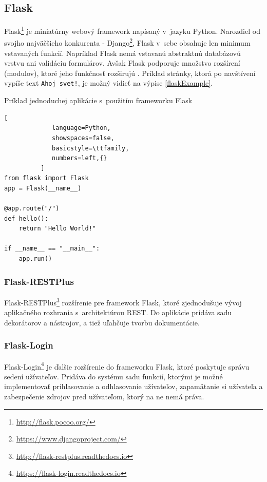\documentclass[zadani,slovak]{fitthesis}
\begin{document}
\subsection{Flask}\label{flask}
Flask\footnote{\url{http://flask.pocoo.org/}} je miniatúrny webový framework napísaný v~jazyku Python. Narozdiel od svojho najväčšieho konkurenta - Django\footnote{\url{https://www.djangoproject.com/}}, Flask v~sebe obsahuje len minimum vstavaných funkcií. Napríklad Flask nemá vstavanú abstraktnú databázovú vrstvu ani validáciu formulárov. Avšak Flask podporuje množstvo rozšírení (modulov), ktoré jeho funkčnosť rozširujú \cite{grinberg2018flask}. Príklad stránky, ktorá po navštívení vypíše text \texttt{Ahoj svet!}, je možný vidieť na výpise \ref{flaskExample}.



\begin{algorithm}[H]
  \caption{Príklad jednoduchej aplikácie s~použitím frameworku Flask}
  \label{flaskExample}
  \begin{lstlisting}[
             language=Python,
             showspaces=false,
             basicstyle=\ttfamily,
             numbers=left,{}
          ]
from flask import Flask
app = Flask(__name__)

@app.route("/")
def hello():
    return "Hello World!"

if __name__ == "__main__":
    app.run()
  \end{lstlisting}
\end{algorithm}

\subsubsection{Flask-RESTPlus}\label{RestPlusFlask}
Flask-RESTPlus\footnote{\url{http://flask-restplus.readthedocs.io}} rozšírenie pre framework Flask, ktoré zjednodušuje vývoj aplikačného rozhrania s~architektúrou REST. Do aplikácie pridáva sadu dekorátorov a nástrojov, a tiež uľahčuje tvorbu dokumentácie.

\subsubsection{Flask-Login}\label{Flask login}
Flask-Login\footnote{\url{https://flask-login.readthedocs.io}} je ďalšie rozšírenie do frameworku Flask, ktoré poskytuje správu sedení užívateľov. Pridáva do systému sadu funkcií, ktorými je možné implementovať prihlasovanie a odhlasovanie užívateľov, zapamätanie si užívateľa a zabezpečenie zdrojov pred užívateľom, ktorý na ne nemá práva.
\end{document}
